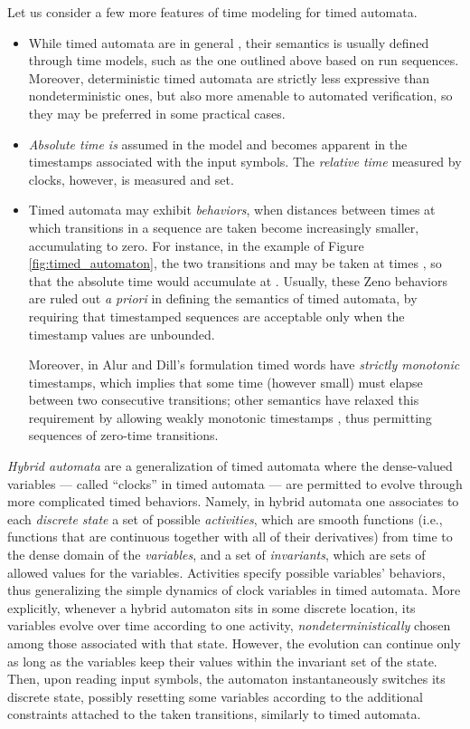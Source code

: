 Let us consider a few more features of time modeling for timed 
automata. 
\begin{itemize}
\item While timed automata are in general , their 
semantics is usually defined through  time models, such 
as the one outlined above based on run sequences. Moreover, deterministic 
timed automata are strictly less expressive than nondeterministic 
ones, but also more amenable to automated verification, so they 
may be preferred in some practical cases.

\item \emph{Absolute time is}  assumed in the model 
and becomes apparent in the timestamps associated with the input 
symbols. The \emph{relative time} measured by clocks, however, is  
measured and set.

\item Timed automata may exhibit  \emph{behaviors}, when distances 
between times at which transitions in a sequence are taken become 
increasingly smaller, accumulating to zero. For instance, in 
the example of Figure \ref{fig:timed_automaton}, the two transitions  and  
may be taken at times , so that the absolute time would accumulate at . Usually, these Zeno behaviors are ruled out \emph{a priori} 
in defining the semantics of timed automata, by requiring that 
timestamped sequences are acceptable only when the timestamp 
values are unbounded.

Moreover, in Alur and Dill's formulation \cite{AD94} timed words have \emph{strictly monotonic} timestamps,
which implies that some time (however small) must elapse between two consecutive transitions; other semantics 
have relaxed this requirement by allowing weakly monotonic timestamps  \cite{BY04}, thus permitting sequences of zero-time transitions. 
\end{itemize}

\emph{Hybrid automata} \cite{ACHH93,NOSY93,Hen96} are a generalization 
of timed automata where the dense-valued variables --- called 
``clocks'' in timed automata --- are permitted to evolve through 
more complicated timed behaviors. Namely, in hybrid automata 
one associates to each \emph{discrete state} a set of possible \emph{activities}, 
which are smooth functions (i.e., functions that are continuous 
together with all of their derivatives) from time to the dense 
domain of the \emph{variables}, and a set of \emph{invariants}, which 
are sets of allowed values for the variables. Activities specify 
possible variables' behaviors, thus generalizing the simple dynamics 
of clock variables in timed automata. More explicitly, whenever 
a hybrid automaton sits in some discrete location, its variables 
evolve over time according to one activity, \emph{nondeterministically} 
chosen among those associated with that state. However, the evolution 
can continue only as long as the variables keep their values 
within the invariant set of the state. Then, upon reading input 
symbols, the automaton instantaneously switches its discrete 
state, possibly resetting some variables according to the additional 
constraints attached to the taken transitions, similarly to timed 
automata.

